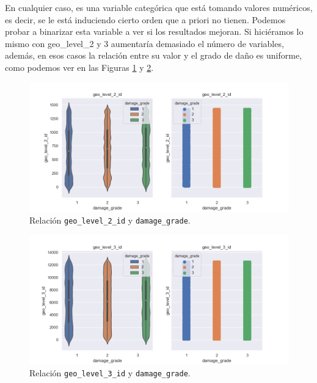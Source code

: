 \documentclass[a4paper, 20pt]{article}
\begin{document}
En cualquier caso, es una variable categórica que está tomando valores numéricos, es decir, se le está induciendo cierto orden que a priori no tienen. Podemos probar a binarizar esta variable a ver si los resultados mejoran. Si hiciéramos lo mismo con geo\_level\_2 y 3 aumentaría demasiado el número de variables, además, en esos casos la relación entre su valor y el grado de daño es uniforme, como podemos ver en las Figuras \ref{fig:geo21} y \ref{fig:geo31}.

\begin{figure}[H]
    \centering
    \includegraphics[height=0.8\textwidth, width=1.0\textwidth]{geo_level_2_1}
    \caption{Relación \texttt{geo\_level\_2\_id} y \texttt{damage\_grade}.}
    \label{fig:geo21}
\end{figure}

\begin{figure}[H]
    \centering
    \includegraphics[height=0.8\textwidth, width=1.0\textwidth]{geo_level_3_1}
    \caption{Relación \texttt{geo\_level\_3\_id} y \texttt{damage\_grade}.}
    \label{fig:geo31}
\end{figure}
\end{document}
